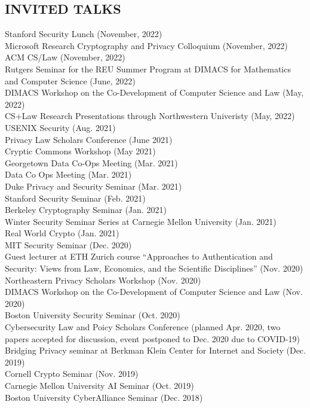 \documentclass{res}
\begin{document}
\begin{resume}
\section{INVITED TALKS}
\vspace{0.1in}
Stanford Security Lunch (November, 2022) \\
Microsoft Research Cryptography and Privacy Colloquium (November, 2022) \\
ACM CS/Law (November, 2022) \\
Rutgers Seminar for the REU Summer Program at DIMACS for Mathematics and Computer Science (June, 2022) \\
DIMACS Workshop on the Co-Development of Computer Science and Law (May, 2022) \\
CS+Law Research Presentations through Northwestern Univeristy (May, 2022) \\
USENIX Security (Aug. 2021) \\
Privacy Law Scholars Conference (June 2021) \\
Cryptic Commons Workshop (May 2021) \\
Georgetown Data Co-Ops Meeting (Mar. 2021) \\
Data Co Ops Meeting (Mar. 2021) \\
Duke Privacy and Security Seminar (Mar. 2021) \\
Stanford Security Seminar (Feb. 2021) \\
Berkeley Cryptography Seminar (Jan. 2021) \\
Winter Security Seminar Series at Carnegie Mellon University (Jan. 2021) \\
Real World Crypto (Jan. 2021) \\
MIT Security Seminar (Dec. 2020) \\
Guest lecturer at ETH Zurich course ``Approaches to Authentication and Security: Views from Law,
Economics, and the Scientific Disciplines'' (Nov. 2020) \\
Northeastern Privacy Scholars Workshop (Nov. 2020) \\
DIMACS Workshop on the Co-Development of Computer Science and Law (Nov. 2020) \\
Boston University Security Seminar (Oct. 2020) \\
Cybersecurity Law and Poicy Scholars Conference (planned Apr. 2020, two papers accepted for
discussion, event postponed to Dec. 2020 due to COVID-19) \\
Bridging Privacy seminar at Berkman Klein Center for Internet and Society (Dec. 2019) \\ 
Cornell Crypto Seminar (Nov. 2019) \\
Carnegie Mellon University AI Seminar (Oct. 2019) \\
Boston University CyberAlliance Seminar (Dec. 2018) \\


\end{resume}
\end{document}
